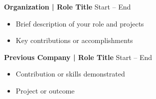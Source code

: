 \vspace{2mm}

\textbf{{{ Organization | Role Title }}} \hfill {{{ Start – End }}} \\
\vspace{-2mm}
\begin{itemize} \itemsep -2pt
    \item {{{ Brief description of your role and projects }}}
    \item {{{ Key contributions or accomplishments }}}
\end{itemize}

\textbf{{{ Previous Company | Role Title }}} \hfill {{{ Start – End }}} \\
\vspace{-2mm}
\begin{itemize} \itemsep -2pt
    \item {{{ Contribution or skills demonstrated }}}
    \item {{{ Project or outcome }}}
\end{itemize}
